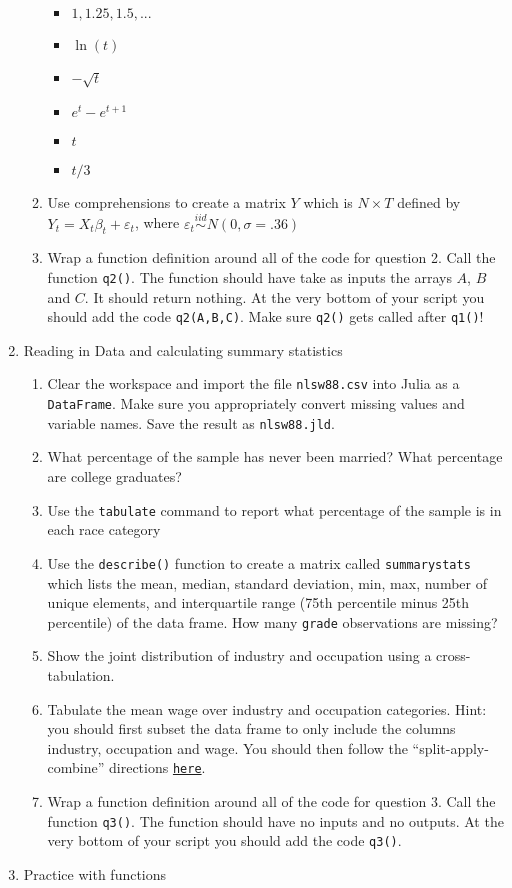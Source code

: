 \documentclass[12pt,english]{article}
\begin{document}
\begin{enumerate}
\begin{enumerate}
\begin{itemize}
\item $1,1.25,1.5,...$
\item $\ln\left(t\right)$
\item $-\sqrt{t}$
\item $e^{t}-e^{t+1}$
\item $t$
\item $t/3$
\end{itemize}
\item Use comprehensions to create a matrix $Y$ which is $N\times T$ defined by $Y_{t}=X_{t}\beta_{t}+\varepsilon_{t}$, where $\varepsilon_{t}\overset{iid}{\sim}N\left(0,\sigma=.36\right)$
\item Wrap a function definition around all of the code for question 2. Call the function \texttt{q2()}. The function should have take as inputs the arrays $A$, $B$ and $C$. It should return nothing. At the very bottom of your script you should add the code \texttt{q2(A,B,C)}. Make sure \texttt{q2()} gets called after \texttt{q1()}!
\end{enumerate}
\item Reading in Data and calculating summary statistics

\begin{enumerate}
\item Clear the workspace and import the file \texttt{nlsw88.csv} into Julia as a \texttt{DataFrame}. Make sure you appropriately convert missing values and variable names. Save the result as \texttt{nlsw88.jld}.
\item What percentage of the sample has never been married? What percentage are college graduates?
\item Use the \texttt{tabulate} command to report what percentage of the sample is in each race category
\item Use the \texttt{describe()} function to create a matrix called \texttt{summarystats} which lists the mean, median, standard deviation, min, max, number of unique elements, and interquartile range (75th percentile minus 25th percentile) of the data frame. How many \texttt{grade} observations are missing?
\item Show the joint distribution of industry and occupation using a cross-tabulation.
\item Tabulate the mean wage over industry and occupation categories. Hint: you should first subset the data frame to only include the columns industry, occupation and wage. You should then follow the ``split-apply-combine'' directions \href{https://juliadata.github.io/DataFrames.jl/stable/man/split_apply_combine/}{\texttt{here}}.
\item Wrap a function definition around all of the code for question 3. Call the function \texttt{q3()}. The function should have no inputs and no outputs. At the very bottom of your script you should add the code \texttt{q3()}.
\end{enumerate}
\item Practice with functions


\end{enumerate}
\end{document}
